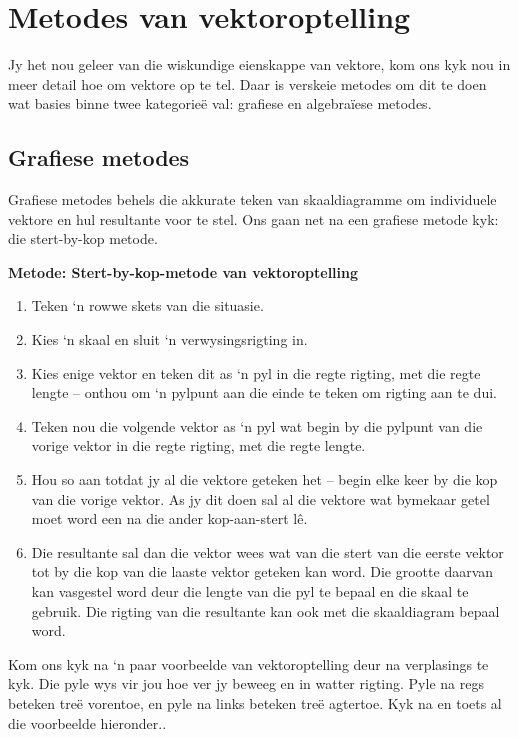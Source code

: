 \section{Metodes van vektoroptelling}

Jy het nou geleer van die wiskundige eienskappe van vektore, kom ons kyk nou in meer detail hoe om vektore op te tel. Daar is verskeie metodes om dit te doen wat basies binne twee kategorieë val: grafiese en algebraïese metodes.

\subsection*{Grafiese metodes}
Grafiese metodes behels die akkurate teken van skaaldiagramme om individuele vektore en hul resultante voor te stel. Ons gaan net na een grafiese metode kyk: die stert-by-kop metode.

\textbf{Metode: Stert-by-kop-metode van vektoroptelling}
\begin{enumerate}[noitemsep, label=\textbf{\arabic*}.]
\item{Teken ‘n rowwe skets van die situasie.}
\item{Kies ‘n skaal en sluit ‘n verwysingsrigting in.}
\item{Kies enige vektor en teken dit as ‘n pyl in die regte rigting, met die regte lengte -- onthou om ‘n pylpunt aan die einde te teken om rigting aan te dui.}
\item{Teken nou die volgende vektor as ‘n pyl wat begin by die pylpunt van die vorige vektor in die regte rigting, met die regte lengte.}
\item{Hou so aan totdat jy al die vektore geteken het -- begin elke keer by die kop van die vorige vektor. As jy dit doen sal al die vektore wat bymekaar getel moet word een na die ander kop-aan-stert l\^{e}.}
\item{Die resultante sal dan die vektor wees wat van die stert van die eerste vektor tot by die kop van die laaste vektor geteken kan word. Die grootte daarvan kan vasgestel word deur die lengte van die pyl te bepaal en die skaal te gebruik. Die rigting van die resultante kan ook met die skaaldiagram bepaal word. }
\end{enumerate} \par


Kom ons kyk na ‘n paar voorbeelde van vektoroptelling deur na verplasings te kyk. Die pyle wys vir jou hoe ver jy beweeg en in watter rigting. Pyle na regs beteken treë vorentoe, en pyle na links beteken treë agtertoe. Kyk na en toets al die voorbeelde hieronder..\par 

